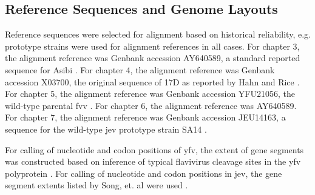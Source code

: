 \subsection{Reference Sequences and Genome Layouts}
Reference sequences were selected for alignment based on historical reliability, e.g. prototype strains were used for alignment references in all cases.  For chapter 3, the alignment reference was Genbank accession AY640589, a standard reported sequence for Asibi \parencite{McElroy:2005ik}. For chapter 4, the alignment reference was Genbank accession X03700, the original sequence of 17D as reported by Hahn and Rice \parencite{Hahn:1987tw}. For chapter 5, the alignment reference was Genbank accession YFU21056, the wild-type parental \gls{fvv} \parencite{Wang:1995vu}.  For chapter 6, the alignment reference was AY640589. For chapter 7, the alignment reference was Genbank accession JEU14163, a sequence for the wild-type \gls{jev} prototype strain SA14 \parencite{Ni:1994vs}. 

For calling of nucleotide and codon positions of \gls{yfv}, the extent of gene segments was constructed based on inference of typical flavivirus cleavage sites in the \gls{yfv} polyprotein \parencite{Rice:1985tn}. For calling of nucleotide and codon positions in \gls{jev}, the gene segment extents listed by Song, et. al were used \parencite{Song:2012iw}. 

